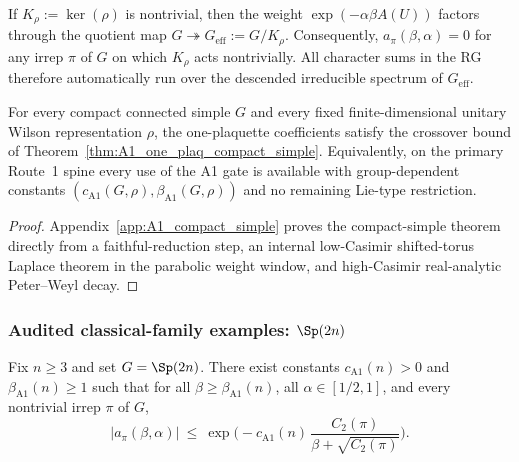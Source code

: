 \begin{remark}
\label{rem:center_vanish}
If $K_\rho:=\ker(\rho)$ is nontrivial, then the weight $\exp(-\alpha\beta A(U))$ factors through the quotient map $G\twoheadrightarrow G_{\mathrm{eff}}:=G/K_\rho$.
Consequently, $a_{\pi}(\beta,\alpha)=0$ for any irrep $\pi$ of $G$ on which $K_\rho$ acts nontrivially.
All character sums in the RG therefore automatically run over the descended irreducible spectrum of $G_{\mathrm{eff}}$.
\end{remark}

\begin{theorem}
\label{thm:rg_A1_group_uniform}
For every compact connected simple $G$ and every fixed finite-dimensional unitary Wilson representation $\rho$, the one-plaquette coefficients satisfy the crossover bound of Theorem~\ref{thm:A1_one_plaq_compact_simple}.
Equivalently, on the primary Route~1 spine every use of the A1 gate is available with group-dependent constants $(c_{\mathrm{A1}}(G,\rho),\beta_{\mathrm{A1}}(G,\rho))$ and no remaining Lie-type restriction.
\end{theorem}

\begin{proof}
Appendix~\ref{app:A1_compact_simple} proves the compact-simple theorem directly from a faithful-reduction step, an internal low-Casimir shifted-torus Laplace theorem in the parabolic weight window, and high-Casimir real-analytic Peter--Weyl decay.
\end{proof}

\subsubsection{Audited classical-family examples: \texorpdfstring{$\Sp(2n)$}{Sp(2n)}}
\label{subsec:Sp_2n_one_plaq}

\begin{proposition}[A1 for $\Sp(2n)$]
\label{prop:A1_Sp}
Fix $n\ge 3$ and set $G=\Sp(2n)$.
There exist constants $c_{\mathrm{A1}}(n)>0$ and $\beta_{\mathrm{A1}}(n)\ge 1$ such that for all $\beta\ge\beta_{\mathrm{A1}}(n)$,
all $\alpha\in[1/2,1]$, and every nontrivial irrep $\pi$ of $G$,
\begin{equation}
\label{eq:A1_Sp_bound}
\big|a_{\pi}(\beta,\alpha)\big|
\ \le\ 
\exp\!\Big(-c_{\mathrm{A1}}(n)\,\frac{C_2(\pi)}{\beta+\sqrt{C_2(\pi)}}\Big).
\end{equation}
\end{proposition}

